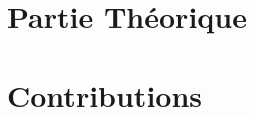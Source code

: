\documentclass[11pt, francais, singlespacing, headsepline,oneside]{MastersDoctoralThesis}
\begin{document}
\newpage
\dominitoc
\mainmatter %
\begin{abstract}
\addchaptertocentry{\abstractname} %

\end{abstract}


\tableofcontents
\tableofcontents
\listoffigures
\listoftables


\pagestyle{thesis} %

\newtheorem{mydef}{Definition}
\newtheorem{theoreme}{Theorème}    
\newtheorem{mylemma}{Lemma}     

\adjustmtc

\adjustmtc
\adjustmtc
\part{Partie Théorique}


\part{Contributions}



\printbibliography[heading=bibintoc]
\end{document}
